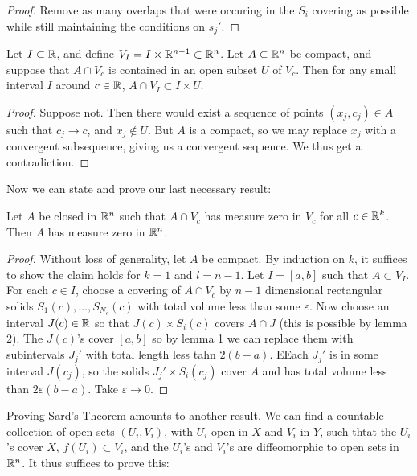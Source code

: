 \begin{proof}
    Remove as many overlaps that were occuring in the $S_i$ covering as possible while still maintaining the conditions on $s_j'$. 
\end{proof}

\begin{lemma}
    Let $I \subset \mathbb{R}$, and define $V_I = I \times \mathbb{R}^{n-1} \subset \mathbb{R}^n$. Let $A \subset \mathbb{R}^n$ be compact, and suppose that $A \cap V_c$ is contained in an open subset $U$ of $V_c$. Then for any small interval $I$ around $c \in \mathbb{R}$, $A \cap V_I \subset I \times U$.
\end{lemma}

\begin{proof}
    Suppose not. Then there would exist a sequence of points $(x_j,c_j) \in A$ such that $c_j \to c$, and $x_j \notin U$. But $A$ is a compact, so we may replace $x_j$ with a convergent subsequence, giving us a convergent sequence. We thus get a contradiction. 
\end{proof}

Now we can state and prove our last necessary result:

\begin{theorem}
    Let $A$ be closed in $\mathbb{R}^n$ such that $A \cap V_c$ has measure zero in $V_c$ for all $c \in \mathbb{R}^k$. Then $A$ has measure zero in $\mathbb{R}^n$. 
\end{theorem}

\begin{proof}
    Without loss of generality, let $A$ be compact. By induction on $k$, it suffices to show the claim holds for $k = 1$ and $l = n-1$. Let $I = [a,b]$ such that $A \subset V_I$. For each $c \in I$, choose a covering of $A \cap V_c$ by $n-1$ dimensional rectangular solids $S_1(c),\ldots, S_{N_c}(c)$ with total volume less than some $\varepsilon$. Now choose an interval $J(c) \in \mathbb{R}$ so that $J(c) \times S_i(c)$ covers $A \cap J$ (this is possible by lemma 2). The $J(c)$'s cover $[a,b]$ so by lemma 1 we can replace them with subintervals $J_j'$ with total length less tahn $2(b-a)$. EEach $J_j'$ is in some interval $J(c_j)$, so the solids $J_j' \times S_i(c_j)$ cover $A$ and has total volume less than $2\varepsilon(b-a)$. Take $\varepsilon \to 0$. 
\end{proof}

Proving Sard's Theorem amounts to another result. We can find a countable collection of open sets $(U_i,V_i)$, with $U_i$ open in $X$ and $V_i$ in $Y$, such thtat the $U_i$'s cover $X$, $f(U_i) \subset V_i$, and the $U_i$'s and $V_i$'s are diffeomorphic to open sets in $\mathbb{R}^n$. It thus suffices to prove this: 

